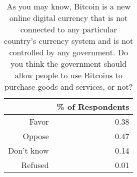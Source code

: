 \begin{table}[ht]
\centering
\begin{tabular}{rr}
  \hline
 & \% of Respondents \\ 
  \hline
Favor & 0.38 \\ 
  Oppose & 0.47 \\ 
  Don't know & 0.14 \\ 
  Refused & 0.01 \\ 
   \hline
\end{tabular}
\caption{As you may know, Bitcoin is a new online digital currency that 
is not connected to any particular country's currency system and is not 
controlled by any government. Do you think the government should allow people 
to use Bitcoins to purchase goods and services, or not?} 
\end{table}
